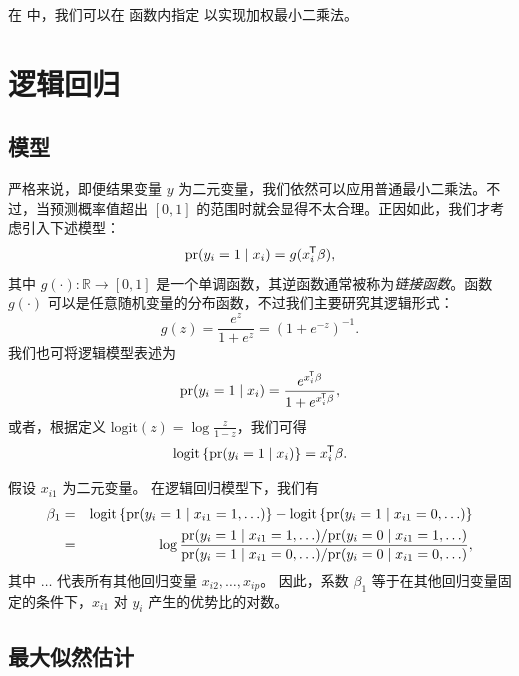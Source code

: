 在  中，我们可以在  函数内指定  以实现加权最小二乘法。 



\section{逻辑回归}\label{sec::logistic-regression}




 
  
 \subsection{模型}
严格来说，即便结果变量 $y$ 为二元变量，我们依然可以应用普通最小二乘法。不过，当预测概率值超出 $[0,1]$ 的范围时就会显得不太合理。正因如此，我们才考虑引入下述模型：
\[
\textup{pr}(y_{i}=1\mid x_{i})=g(x_{i} ^{\mkern-1.5mu\mathsf{T}} \beta),
\]
其中 $g(\cdot):\mathbb{R}\rightarrow[0,1]$ 是一个单调函数，其逆函数通常被称为{\it 链接函数}。函数 $g(\cdot)$ 可以是任意随机变量的分布函数，不过我们主要研究其逻辑形式：
$$
g(z) =  \frac{ e^z }{1 + e^z} = (1 + e^{-z})^{-1}. 
$$
我们也可将逻辑模型表述为
$$
\textup{pr}(y_{i}=1\mid x_{i}) =\frac{e^{x_{i} ^{\mkern-1.5mu\mathsf{T}} \beta}}{1+e^{x_{i} ^{\mkern-1.5mu\mathsf{T}} \beta}},
$$
或者，根据定义 $\text{logit}(z) = \log\frac{z}{1-z}$，我们可得
\[
\text{logit}\left\{ \textup{pr}(y_{i}=1\mid x_{i})\right\}  =x_{i} ^{\mkern-1.5mu\mathsf{T}} \beta.
\]

假设 $x_{i1}$ 为二元变量。  
在逻辑回归模型下，我们有
\begin{eqnarray*}
\beta_1 &=& \text{logit}\left\{ \textup{pr}(y_{i}=1\mid x_{i1} = 1,  \ldots )\right\}  - \text{logit}\left\{ \textup{pr}(y_{i}=1\mid x_{i1} = 0,\ldots)\right\}   \\
&=& \log \frac{  \textup{pr}(y_{i}=1\mid x_{i1} = 1, \ldots)/\textup{pr}(y_{i}=0\mid x_{i1} = 1, \ldots)     }
{  \textup{pr}(y_{i}=1\mid x_{i1} = 0, \ldots)/\textup{pr}(y_{i}=0\mid x_{i1} = 0, \ldots)    } ,
\end{eqnarray*}
其中 $\ldots$ 代表所有其他回归变量 $ x_{i2}, \ldots, x_{ip} $。
因此，系数 $\beta_1$ 等于在其他回归变量固定的条件下，$x_{i1}$ 对 $y_i$ 产生的优势比的对数。 



\subsection{最大似然估计}\label{sec::mle-logistic}


